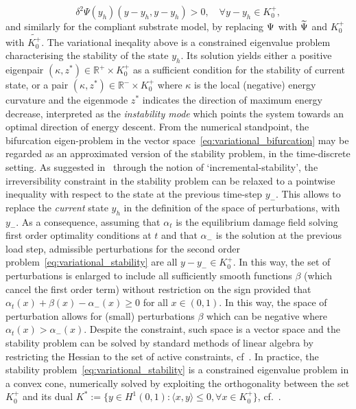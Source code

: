 \newcommand{\conespace}{K^+_{0}}
\begin{equation}
     \label{eq:variational_stability}
     \delta^2 \Psi(y_h)(y - y_h,  y - y_h)  > 0, \quad \forall y-y_h \in \conespace,
 \end{equation}
and similarly for the compliant substrate model, by replacing $\Psi$ with $\widetilde\Psi$ and $\conespace$ with $\widetilde{\conespace}$.
The variational ineqality above is a constrained eigenvalue problem characterising the stability of the state $y_h$. Its solution yields either a positive eigenpair $(\kappa, z^*)\in \mathbb{R}^+\times K^+_0$ as a sufficient condition for the stability of current state, or a pair $(\kappa, z^*)\in \mathbb{R}^-\times K^+_0$ where $\kappa$ is the local (negative) energy curvature and the eigenmode $z^*$ indicates the direction of maximum energy decrease, interpreted as the \emph{instability mode} which points the system towards an optimal direction of energy descent. 
From the numerical standpoint, the bifurcation eigen-problem in the vector space~\eqref{eq:variational_bifurcation} may be regarded as an approximated version of the stability problem, in the time-discrete setting. As suggested in~\cite{Baldelli2021-gc} through the notion of `incremental-stability', the irreversibility constraint in the stability problem can be relaxed to a pointwise inequality with respect to the state at the previous time-step $y_-$.
This allows to replace the \emph{current} state $y_h$ in the definition of the space of perturbations, with $y_-$. As a consequence, assuming that $\alpha_t$ is the equilibrium damage field solving first order optimality conditions at $t$ and that $\alpha_-$ is the solution at the previous load step, admissible perturbations for the second order problem~\eqref{eq:variational_stability} are all $y-y_-\in \conespace$. In this way, the set of perturbations is enlarged to include all sufficiently smooth functions $\beta$ (which cancel the first order term) without restriction on the sign provided that $\alpha_t(x) + \beta(x) - \alpha_-(x)\geq 0$ for all $x\in (0, 1)$.
% 
In this way, the space of perturbation allows for (small) perturbations $\beta$ which can be negative where $\alpha_t(x)>\alpha_-(x)$. Despite the constraint, such space is a vector space and the stability problem can be solved by standard methods of linear algebra by restricting the Hessian to the set of active constraints, cf~\cite{Nocedal1999-zr}.
In practice, the stability problem~\eqref{eq:variational_stability} is a constrained eigenvalue problem in a convex cone, numerically solved by exploiting the orthogonality between the set $\conespace$ and its dual $K^*:=\{y \in H^1(0,1): \langle x,y \rangle \leq 0, \forall x \in \conespace\}$, cf.~\cite{moreau, pinto-da-costa}.





